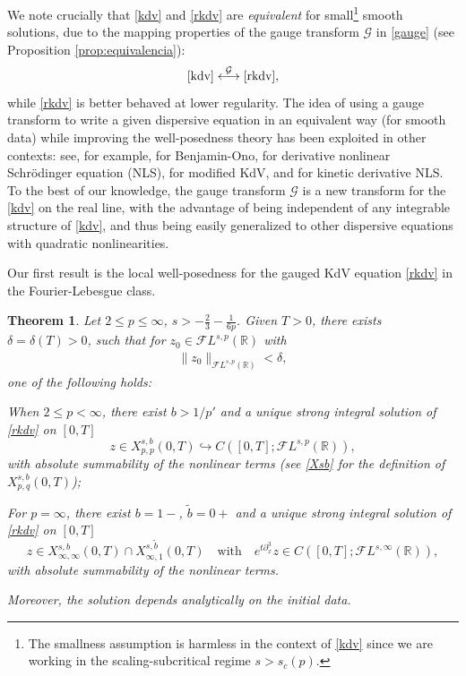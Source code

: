 \documentclass[%
11pt,  reqno]{amsart}
\newcommand{\5}{\textup{V}}
\newcommand{\noi}{\noindent}
\newcommand{\FL}{\mathcal{F} L}
\newcommand{\dl}{\delta}
\newtheorem{theorem}{Theorem} [section]
\theoremstyle{remark}
\newcommand{\R}{\mathbb{R}}
\newcommand{\Gc}{\mathcal{G}}
\numberwithin{equation}{section}
\numberwithin{theorem}{section}
\begin{document}
    We note crucially that \eqref{kdv} and \eqref{rkdv} are \textit{equivalent} for small\footnote{The smallness assumption is harmless in the context of \eqref{kdv} since we are working in the scaling-subcritical regime $s>s_c(p)$.} smooth solutions, due to the mapping properties of the gauge transform $\Gc$ in \eqref{gauge} (see Proposition \ref{prop:equivalencia}):
    $$
\eqref{kdv} \overset{\Gc}{\longleftrightarrow} \eqref{rkdv}, 
    $$
while \eqref{rkdv} is better behaved at lower regularity. 
%
%
The idea of using a gauge transform to write a given dispersive equation in an equivalent way (for smooth data) while improving the well-posedness theory has been exploited in other contexts: see, for example,   \cite{IfrimTataru, MolinetPilod_bo, tao_bo} for Benjamin-Ono, \cite{CKSTT_dnls, Herr_dnls, takaoka_dnls} for derivative nonlinear Schr\"odinger equation (NLS), \cite{Chapouto_FL_mkdv} for modified KdV, and \cite{KishimotoTsutsumi_kdnls} for kinetic derivative NLS.
To the best of our knowledge, the gauge transform $\Gc$ is a new transform for the \eqref{kdv} on the real line, with the advantage of being independent of 
any integrable structure of \eqref{kdv}, and thus being easily generalized to other dispersive equations with quadratic nonlinearities.

\medskip

 Our first result is the local well-posedness for the gauged KdV equation \eqref{rkdv} in the Fourier-Lebesgue class.
    
	\begin{theorem}\label{thm:lwp_rkdv}
Let $2 \le p \le \infty$, $s> - \frac23 - \frac{1}{6p}$. Given $T>0$, there exists $\dl = \dl(T)>0$, such that for $z_0 \in \FL^{s, p}(\R)$ with
\begin{align}
    \|z_0\|_{\FL^{s,p}(\R)} < \dl, 
\end{align}
one of the following holds:

\vspace{1mm}

\noi{\rm(i)}
When $ 2 \le p <\infty$, 
there exist $b>1/p'$ and  a unique strong integral solution of \eqref{rkdv} on $[0,T]$
	$$z\in X^{s,b}_{p, p}(0,T)\hookrightarrow C([0,T]; \mathcal{F}L^{s,p}(\R)),$$ 
    with absolute summability of the nonlinear terms (see \eqref{Xsb} for the definition of $X^{s,b}_{p,q}(0,T)$);

\vspace{1mm}

\smallskip
\noi{\rm(ii)}
For $p=\infty$, there exist $b=1-$, $\tilde{b}=0+$ and a unique strong integral solution of \eqref{rkdv} on $[0,T]$
	$$z\in X^{s,b}_{\infty,\infty}(0,T)\cap X^{s,\tilde{b}}_{\infty,1}(0,T)
    \quad 
    \text{with}
    \quad 
    e^{t\partial_x^3}z \in C([0,T]; \mathcal{F}L^{s,\infty}(\R))
    ,
    $$ 
    with absolute summability of the nonlinear terms.

\smallskip 
\noi
    Moreover, the solution depends analytically on the initial data.
\end{theorem}
\end{document}
